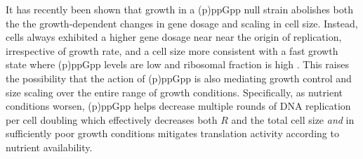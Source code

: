 It has recently been shown that growth in a (p)ppGpp null strain abolishes both
the the growth-dependent changes in gene dosage and  scaling in cell size.
Instead, cells always exhibited a higher gene dosage near  near the origin of
replication, irrespective of growth rate, and a cell size more consistent with a
fast growth state where (p)ppGpp levels are low \citep{fernandezcoll2020} and
ribosomal fraction is high \citep{zhu2019}. This raises the possibility that the
action of (p)ppGpp is also mediating growth control and size scaling over the
entire range of growth conditions. Specifically, as nutrient conditions worsen,
(p)ppGpp helps decrease multiple rounds of DNA replication per cell doubling
which effectively decreases both $R$ and the total cell size \textit{and} in
sufficiently poor growth conditions mitigates translation activity according to
nutrient availability.
